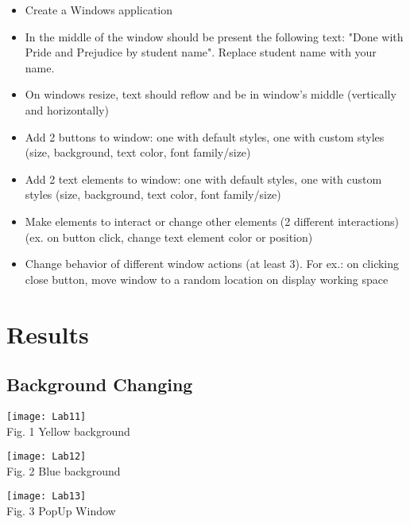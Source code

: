 \documentclass[12pt]{article}
\begin{document}
  \begin{itemize}
    \renewcommand{\labelitemi}{$\circ$}
    \item Create a Windows application
    \item In the middle of the window should be present the following text: "Done with Pride and Prejudice by student name". Replace student name with your name.
    \item On windows resize, text should reflow and be in window's middle (vertically and horizontally)
    \item Add 2 buttons to window: one with default styles, one with custom styles (size, background, text color, font family/size)
    \item Add 2 text elements to window: one with default styles, one with custom styles (size, background, text color, font family/size)
    \item Make elements to interact or change other elements (2 different interactions) (ex. on button click, change text element color or position)
    \item Change behavior of different window actions (at least 3). For ex.: on clicking close button, move window to a random location on display working space
  \end{itemize}


  \section{Results}




\subsection{Background Changing}
\begin{minipage}[b]{1.0\linewidth}
      \begin{center}
        \texttt{[image: Lab11]}
         \\ Fig. 1 Yellow background
      \end{center}
    \end{minipage}

    \begin{minipage}[b]{1.0\linewidth}
      \begin{center}
        \texttt{[image: Lab12]}
         \\ Fig. 2 Blue background
      \end{center}
    \end{minipage}
    \begin{minipage}[b]{1.0\linewidth}
      \begin{center}
        \texttt{[image: Lab13]}
         \\ Fig. 3 PopUp Window
      \end{center}
    \end{minipage}
    
\end{document}
